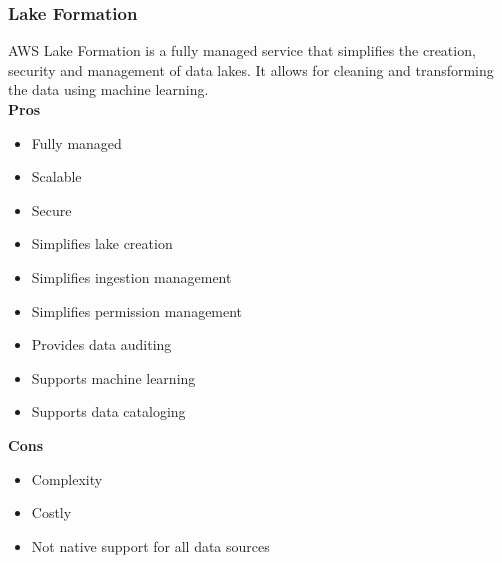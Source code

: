         \subsubsection{Lake Formation}
        \label{aws:lake-formation}
        AWS Lake Formation is a fully managed service that simplifies the creation, security and management of data lakes.
        It allows for cleaning and transforming the data using machine learning.\\
        \textbf{Pros}
        \begin{itemize}
            \item Fully managed
            \item Scalable
            \item Secure
            \item Simplifies lake creation 
            \item Simplifies ingestion management    
            \item Simplifies permission management      
            \item Provides data auditing 
            \item Supports machine learning
            \item Supports data cataloging
        \end{itemize}
        \textbf{Cons}
        \begin{itemize}
            \item Complexity
            \item Costly
            \item Not native support for all data sources
        \end{itemize}

